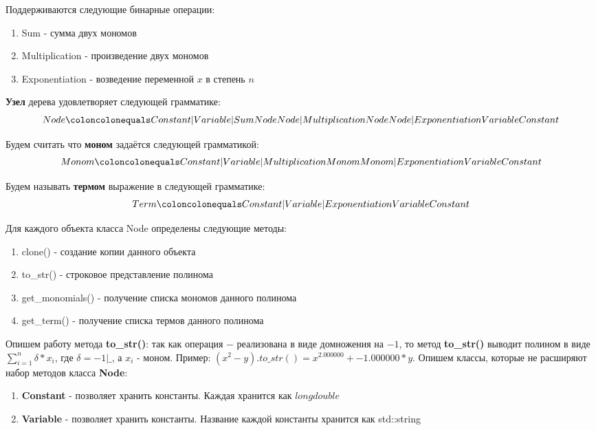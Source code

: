 \documentclass{article}
\begin{document}
Поддерживаются следующие бинарные операции: 
    \begin{enumerate}\bfseries
        \item Sum - сумма двух мономов
        \item Multiplication - произведение двух мономов
        \item Exponentiation - возведение переменной $x$ в степень $n$
    \end{enumerate}

\textbf{Узел} дерева удовлетворяет следующей грамматике: 
    $$Node \coloncolonequals Constant | Variable | Sum Node Node | Multiplication Node Node | Exponentiation Variable Constant$$

Будем считать что \textbf{моном} задаётся следующей грамматикой:
   $$Monom \coloncolonequals Constant | Variable | Multiplication Monom Monom | Exponentiation Variable Constant$$

Будем называть \textbf{термом} выражение в следующей грамматике:
   $$Term \coloncolonequals Constant | Variable | Exponentiation Variable Constant$$

Для каждого объекта класса Node определены следующие методы:
    \begin{enumerate}\bfseries
        \item clone() - создание копии данного объекта
        \item to\_str() - строковое представление полинома
        \item get\_monomials() - получение списка мономов данного полинома
        \item get\_term() - получение списка термов данного полинома
    \end{enumerate}

Опишем работу метода \textbf{to\_str()}: так как операция $-$ реализована в виде домножения на $-1$, то
метод \textbf{to\_str()} выводит полином в виде $\sum_{i=1}^n \delta*x_i$, где $\delta = -1 | \_$, а $x_i$ - моном.
Пример: $(x^2-y).to\_str() = x^{2.000000} + -1.000000 * y$.  
\newpage
Опишем классы, которые не расширяют набор методов класса \textbf{Node}:
\begin{enumerate}
    \item \textbf{Constant} - позволяет хранить константы. Каждая хранится как $long double$
    \item \textbf{Variable} - позволяет хранить константы. Название каждой константы хранится как std::string
\end{enumerate}
\end{document}
